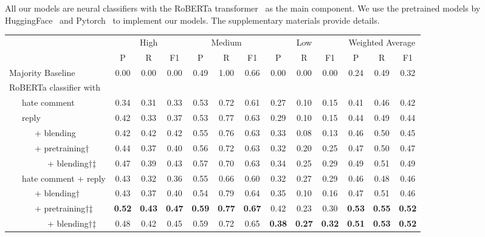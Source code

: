 \documentclass[11pt]{article}
\begin{document}
	
	All our models are neural classifiers with the RoBERTa transformer~\cite{DBLP:journals/corr/abs-1907-11692} as the main component.
	We use the pretrained models by HuggingFace~\cite{wolf-etal-2020-transformers}
	and Pytorch~\cite{NEURIPS2019_9015} to implement our models.
	The supplementary materials provide details.
	
	\begin{table*}[ht!]
		\setlength{\tabcolsep}{.0775in}
		\small
		\centering	
		\begin{tabular}{l ccc ccc ccc ccc}
			\toprule
			\multicolumn{1}{c}{} & \multicolumn{3}{c}{High} & \multicolumn{3}{c}{Medium} & \multicolumn{3}{c}{Low} & \multicolumn{3}{c}{Weighted Average} \\
			\cmidrule(lr){2-4} \cmidrule(lr){5-7} \cmidrule(lr){8-10} \cmidrule(lr){11-13} 
			& P & R & F1 & P & R & F1 & P & R & F1 & P & R & F1 \\
			\hline
			\addlinespace[1pt]
			Majority Baseline & 0.00 & 0.00 & 0.00 & 0.49 & 1.00 & 0.66 & 0.00 & 0.00 & 0.00 &  0.24 & 0.49 & 0.32 \\ \addlinespace
			
			RoBERTa classifier with \\ 
			~~~hate comment & 0.34 & 0.31 & 0.33 & 0.53 & 0.72 & 0.61 & 0.27 & 0.10 & 0.15 & 0.41 & 0.46 & 0.42 \\ \addlinespace
			
			~~~reply & 0.42 & 0.33 & 0.37 & 0.53 & 0.77 & 0.63 & 0.29 & 0.10 & 0.15 & 0.44 & 0.49 & 0.44\\		
			~~~~~~+ blending & 0.42 & 0.42 & 0.42 & 0.55 & 0.76 & 0.63 & 0.33 & 0.08 & 0.13 & 0.46 & 0.50 & 0.45\\
			~~~~~~+ pretraining† & 0.44 & 0.37 & 0.40 & 0.56 & 0.72 & 0.63 & 0.32 & 0.20 & 0.25 & 0.47 & 0.50 & 0.47\\ 
			~~~~~~~~~+ blending†‡ & 0.47 & 0.39 & 0.43 & 0.57 & 0.70 & 0.63 & 0.34 & 0.25 & 0.29 & 0.49 & 0.51 & 0.49\\ 
			\addlinespace
			
			~~~hate comment + reply & 0.43 & 0.32 & 0.36 & 0.55 & 0.66 & 0.60 & 0.32 & 0.27 & 0.29 & 0.46 & 0.48 & 0.46\\
			~~~~~~+ blending† & 0.43 & 0.37 & 0.40 & 0.54 & 0.79 & 0.64 & 0.35 & 0.10 & 0.16 & 0.47 & 0.51 & 0.46\\
			~~~~~~+ pretraining†‡ & \textbf{0.52} & \textbf{0.43} & \textbf{0.47} & \textbf{0.59} & \textbf{0.77}& \textbf{0.67} & 0.42 & 0.23 & 0.30 & \textbf{0.53 }& \textbf{0.55} & \textbf{0.52}\\
			~~~~~~~~~+ blending†‡ & 0.48 & 0.42 & 0.45 & 0.59 & 0.72 & 0.65 & \textbf{0.38} & \textbf{0.27} & \textbf{0.32} & \textbf{0.51} & \textbf{0.53} & \textbf{0.52}\\
			\bottomrule
			

\end{tabular}
\end{table*}
\end{document}

